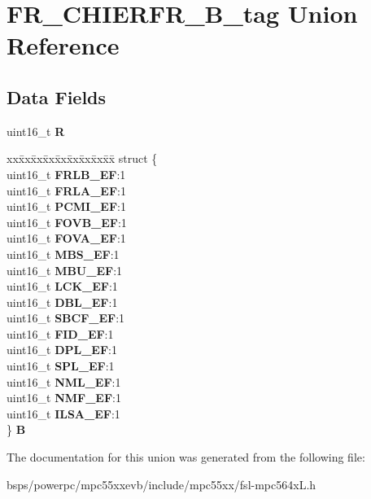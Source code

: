 \hypertarget{unionFR__CHIERFR__16B__tag}{}\section{F\+R\+\_\+\+C\+H\+I\+E\+R\+F\+R\+\_\+B\+\_\+tag Union Reference}
\label{unionFR__CHIERFR__16B__tag}
\subsection*{Data Fields}
\begin{DoxyCompactItemize}
\item 
\mbox{\label{unionFR__CHIERFR__16B__tag_ade72d8382f6cd3eda5d6e5737ca33555}} 
uint16\+\_\+t {\bfseries R}
\item 
\mbox{\label{unionFR__CHIERFR__16B__tag_a183830e881202ae2be0b20f725e91b67}} 
\begin{tabbing}
xx\=xx\=xx\=xx\=xx\=xx\=xx\=xx\=xx\=\kill
struct \{\\
\>uint16\_t {\bfseries FRLB\_EF}:1\\
\>uint16\_t {\bfseries FRLA\_EF}:1\\
\>uint16\_t {\bfseries PCMI\_EF}:1\\
\>uint16\_t {\bfseries FOVB\_EF}:1\\
\>uint16\_t {\bfseries FOVA\_EF}:1\\
\>uint16\_t {\bfseries MBS\_EF}:1\\
\>uint16\_t {\bfseries MBU\_EF}:1\\
\>uint16\_t {\bfseries LCK\_EF}:1\\
\>uint16\_t {\bfseries DBL\_EF}:1\\
\>uint16\_t {\bfseries SBCF\_EF}:1\\
\>uint16\_t {\bfseries FID\_EF}:1\\
\>uint16\_t {\bfseries DPL\_EF}:1\\
\>uint16\_t {\bfseries SPL\_EF}:1\\
\>uint16\_t {\bfseries NML\_EF}:1\\
\>uint16\_t {\bfseries NMF\_EF}:1\\
\>uint16\_t {\bfseries ILSA\_EF}:1\\
\} {\bfseries B}\\

\end{tabbing}\end{DoxyCompactItemize}


The documentation for this union was generated from the following file\+:\begin{DoxyCompactItemize}
\item 
bsps/powerpc/mpc55xxevb/include/mpc55xx/fsl-\/mpc564x\+L.\+h\end{DoxyCompactItemize}
